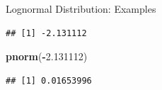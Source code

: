 \documentclass[ignorenonframetext,]{beamer}
\newenvironment{Shaded}{\begin{snugshade}}{\end{snugshade}}
\newcommand{\KeywordTok}[1]{\textcolor[rgb]{0.13,0.29,0.53}{\textbf{#1}}}
\newcommand{\FloatTok}[1]{\textcolor[rgb]{0.00,0.00,0.81}{#1}}
\newcommand{\OperatorTok}[1]{\textcolor[rgb]{0.81,0.36,0.00}{\textbf{#1}}}
\newcommand{\NormalTok}[1]{#1}
\begin{document}
\begin{frame}[fragile]{Lognormal Distribution: Examples}
\begin{verbatim}
## [1] -2.131112
\end{verbatim}

\begin{Shaded}
\begin{Highlighting}[]
\KeywordTok{pnorm}\NormalTok{(}\OperatorTok{-}\FloatTok{2.131112}\NormalTok{)}
\end{Highlighting}
\end{Shaded}

\begin{verbatim}
## [1] 0.01653996
\end{verbatim}

\end{frame}
\end{document}
